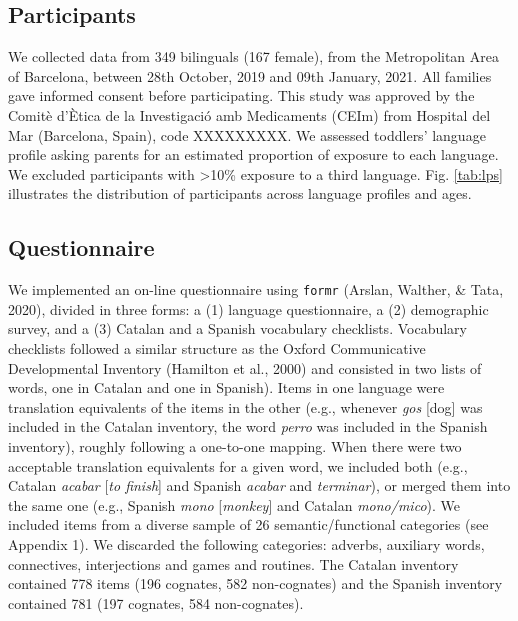 \documentclass[
  english,
  man,man,floatsintext]{apa6}
\begin{document}
\hypertarget{participants}{%
\subsection{Participants}\label{participants}}

We collected data from 349 bilinguals (167 female), from the Metropolitan Area of Barcelona, between 28th October, 2019 and 09th January, 2021. All families gave informed consent before participating. This study was approved by the Comitè d'Ètica de la Investigació amb Medicaments (CEIm) from Hospital del Mar (Barcelona, Spain), code XXXXXXXXX. We assessed toddlers' language profile asking parents for an estimated proportion of exposure to each language. We excluded participants with \textgreater10\% exposure to a third language. Fig. \ref{tab:lps} illustrates the distribution of participants across language profiles and ages.

\hypertarget{questionnaire}{%
\subsection{Questionnaire}\label{questionnaire}}

We implemented an on-line questionnaire using \texttt{formr} (Arslan, Walther, \& Tata, 2020), divided in three forms: a (1) language questionnaire, a (2) demographic survey, and a (3) Catalan and a Spanish vocabulary checklists. Vocabulary checklists followed a similar structure as the Oxford Communicative Developmental Inventory (Hamilton et al., 2000) and consisted in two lists of words, one in Catalan and one in Spanish). Items in one language were translation equivalents of the items in the other (e.g., whenever \emph{gos} {[}dog{]} was included in the Catalan inventory, the word \emph{perro} was included in the Spanish inventory), roughly following a one-to-one mapping. When there were two acceptable translation equivalents for a given word, we included both (e.g., Catalan \emph{acabar} {[}\emph{to finish}{]} and Spanish \emph{acabar} and \emph{terminar}), or merged them into the same one (e.g., Spanish \emph{mono} {[}\emph{monkey}{]} and Catalan \emph{mono/mico}). We included items from a diverse sample of 26 semantic/functional categories (see Appendix 1). We discarded the following categories: adverbs, auxiliary words, connectives, interjections and games and routines. The Catalan inventory contained 778 items (196 cognates, 582 non-cognates) and the Spanish inventory contained 781 (197 cognates, 584 non-cognates).
\end{document}
